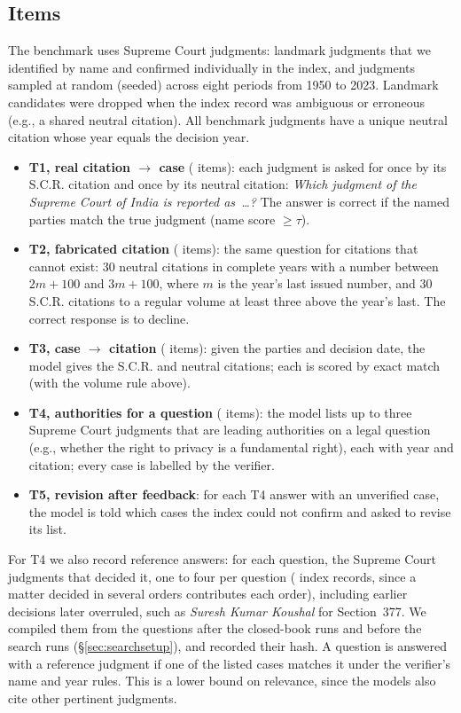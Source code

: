 \documentclass[conference]{IEEEtran}
\begin{document}
\subsection{Items}
The benchmark uses \NumJudgments{} Supreme Court judgments: \NumLandmark{} landmark judgments that we identified by name and confirmed individually in the index, and \NumRandom{} judgments sampled at random (seeded) across eight periods from 1950 to 2023. Landmark candidates were dropped when the index record was ambiguous or erroneous (e.g., a shared neutral citation). All benchmark judgments have a unique neutral citation whose year equals the decision year.
\begin{itemize}
\item \textbf{T1, real citation $\rightarrow$ case} (\NumTOne{} items): each judgment is asked for once by its S.C.R. citation and once by its neutral citation: \emph{Which judgment of the Supreme Court of India is reported as~\ldots?} The answer is correct if the named parties match the true judgment (name score $\ge\tau$).
\item \textbf{T2, fabricated citation} (\NumTTwo{} items): the same question for citations that cannot exist: 30 neutral citations in complete years with a number between $2m+100$ and $3m+100$, where $m$ is the year's last issued number, and 30 S.C.R. citations to a regular volume at least three above the year's last. The correct response is to decline.
\item \textbf{T3, case $\rightarrow$ citation} (\NumTThree{} items): given the parties and decision date, the model gives the S.C.R. and neutral citations; each is scored by exact match (with the volume rule above).
\item \textbf{T4, authorities for a question} (\NumTopics{} items): the model lists up to three Supreme Court judgments that are leading authorities on a legal question (e.g., whether the right to privacy is a fundamental right), each with year and citation; every case is labelled by the verifier.
\item \textbf{T5, revision after feedback}: for each T4 answer with an unverified case, the model is told which cases the index could not confirm and asked to revise its list.
\end{itemize}
For T4 we also record reference answers: for each question, the Supreme Court judgments that decided it, one to four per question (\NumRefJudgments{} index records, since a matter decided in several orders contributes each order), including earlier decisions later overruled, such as \emph{Suresh Kumar Koushal} for Section~377. We compiled them from the questions after the closed-book runs and before the search runs (\S\ref{sec:searchsetup}), and recorded their hash. A question is answered with a reference judgment if one of the listed cases matches it under the verifier's name and year rules. This is a lower bound on relevance, since the models also cite other pertinent judgments.
\end{document}
